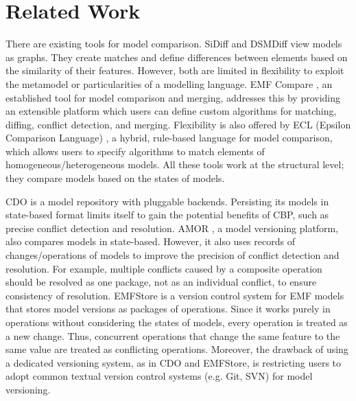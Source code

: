 \documentclass{jot}
\begin{document}
\section{Related Work}
\label{sec:related_work}
There are existing tools for model comparison. SiDiff \cite{Treude2007SiDiff} and DSMDiff \cite{lin2009dsmdiff} view models as graphs. They create matches and define differences between elements based on the similarity of their features. However, both are limited in flexibility to exploit the metamodel or particularities of a modelling language. EMF Compare \cite{emfcompare2018developer}, an established tool for model comparison and merging, addresses this by providing an extensible platform which users can define custom algorithms for matching, diffing, conflict detection, and merging. Flexibility is also offered by ECL (Epsilon Comparison Language) \cite{kolovos2009ecl}, a hybrid, rule-based language for model comparison, which allows users to specify algorithms to match elements of homogeneous/heterogeneous models. All these tools work at the structural level; they compare models based on the states of models.

CDO \cite{eclipse2019cdo} is a model repository with pluggable backends. Persisting its models in state-based format limits itself to gain the potential benefits of CBP, such as precise conflict detection and resolution. AMOR \cite{DBLP:conf/sfm/BroschKLSWW12}, a model versioning platform, also compares models in state-based. However, it also uses records of changes/operations of models to improve the precision of conflict detection and resolution. For example, multiple conflicts caused by a composite operation should be resolved as one package, not as an individual conflict, to ensure consistency of resolution. EMFStore \cite{koegel2010emfstore} is a version control system for EMF models that stores model versions as packages of operations. Since it works purely in operations without considering the states of models, every operation is treated as a new change. Thus, concurrent operations that change the same feature to the same value are treated as conflicting operations. Moreover, the drawback of using a dedicated versioning system, as in CDO and EMFStore, is restricting users to adopt common textual version control systems (e.g. Git, SVN) for model versioning.  
\end{document}
